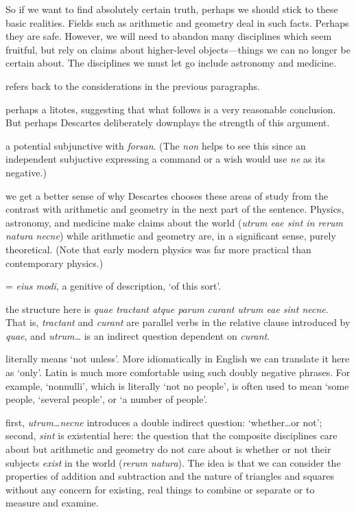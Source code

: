 \prenotes

So if we want to find absolutely certain truth, perhaps we should stick to these basic realities. Fields such as arithmetic and geometry deal in such facts. Perhaps they are safe. However, we will need to abandon many disciplines which seem fruitful, but rely on claims about higher-level objects---things we can no longer be certain about. The disciplines we must let go include astronomy and medicine.

 refers back to the considerations in the previous paragraphs.

 perhaps a litotes, suggesting that what follows is a very reasonable conclusion. But perhaps Descartes deliberately downplays the strength of this argument.

 a potential subjunctive with \textit{forsan}. (The \textit{non} helps to see this since an independent subjuctive expressing a command or a wish would use \textit{ne} as its negative.)

 we get a better sense of why Descartes chooses these areas of study from the contrast with arithmetic and geometry in the next part of the sentence. Physics, astronomy, and medicine make claims about the world (\textit{utrum eae sint in rerum natura necne}) while arithmetic and geometry are, in a significant sense, purely theoretical. (Note that early modern physics was far more practical than contemporary physics.)

 = \textit{eius modi}, a genitive of description, `of this sort'.

 the structure here is \textit{quae tractant atque parum curant utrum eae sint necne}. That is, \textit{tractant} and \textit{curant} are parallel verbs in the relative clause introduced by \textit{quae}, and \textit{utrum\dots} is an indirect question dependent on \textit{curant}.

 literally means `not unless'. More idiomatically in English we can translate it here as `only'. Latin is much more comfortable using such doubly negative phrases. For example, `nonnulli', which is literally `not no people', is often used to mean `some people, `several people', or `a number of people'.

 first, \textit{utrum\dots necne} introduces a double indirect question: `whether\dots or not'; second, \textit{sint} is existential here: the question that the composite disciplines care about but arithmetic and geometry do not care about is whether or not their subjects \textit{exist} in the world (\textit{rerum natura}). The idea is that we can consider the properties of addition and subtraction and the nature of triangles and squares without any concern for existing, real things to combine or separate or to measure and examine.


